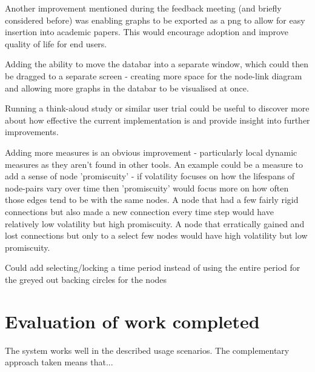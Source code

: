 Another improvement mentioned during the feedback meeting (and briefly considered before) was enabling graphs to be exported as a png to allow for easy insertion into academic papers. This would encourage adoption and improve quality of life for end users.
\newline

Adding the ability to move the databar into a separate window, which could then be dragged to a separate screen - creating more space for the node-link diagram and allowing more graphs in the databar to be visualised at once. 
\newline

Running a think-aloud study or similar user trial could be useful to discover more about how effective the current implementation is and provide insight into further improvements.
\newline

Adding more measures is an obvious improvement - particularly local dynamic measures as they aren't found in other tools. An example could be a measure to add a sense of node 'promiscuity' - if volatility focuses on how the lifespans of node-pairs vary over time then 'promiscuity' would focus more on how often those edges tend to be with the same nodes. A node that had a few fairly rigid connections but also made a new connection every time step would have relatively low volatility but high promiscuity. A node that erratically gained and lost connections but only to a select few nodes would have high volatility but low promiscuity.

Could add selecting/locking a time period instead of using the entire period for the greyed out backing circles for the nodes

\section{Evaluation of work completed} 
The system works well in the described usage scenarios. The complementary approach taken means that...
